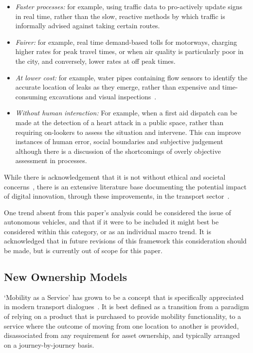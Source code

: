 \documentclass[journal]{IEEEtran}
\begin{document}
\begin{itemize}
\item {\emph{Faster processes:}} for example, using traffic data to
pro-actively update signs in real time, rather than the slow, reactive
methods by which traffic is informally advised against taking certain
routes.
\item {\emph{Fairer:}} for example, real time demand-based tolls for
motorways, charging higher rates for peak travel times, or when air
quality is particularly poor in the city, and conversely, lower rates
at off peak times.
\item {\emph{At lower cost:}} for example, water pipes containing flow
sensors to identify the accurate location of leaks as they emerge,
rather than expensive and time-consuming excavations and visual
inspections~\cite{cosgrave-et-al:2014}.
\item {\emph{Without human interaction:}} For example, when a first
aid dispatch can be made at the detection of a heart attack in a
public space, rather than requiring on-lookers to assess the situation
and intervene. This can improve instances of human error, social
boundaries and subjective judgement although there is a discussion of
the shortcomings of overly objective assessment in processes.
\end{itemize}

While there is acknowledgement that it is not without ethical and
societal concerns~\cite{bimber:1990,oatley-et-al_dasc:2015}, there is
an extensive literature base documenting the potential impact of
digital innovation, through these improvements, in the transport
sector~\cite{enoch:2015}.

One trend absent from this paper's analysis could be considered the
issue of autonomous vehicles, and that if it were to be included it
might best be considered within this category, or as an individual
macro trend. It is acknowledged that in future revisions of this
framework this consideration should be made, but is currently out of
scope for this paper.


\subsection{New Ownership Models}

`Mobility as a Service' has grown to be a concept that is specifically
appreciated in modern transport dialogues~\cite{tscatapult:2016}. It
is best defined as a transition from a paradigm of relying on a
product that is purchased to provide mobility functionality, to a
service where the outcome of moving from one location to another is
provided, disassociated from any requirement for asset ownership, and
typically arranged on a journey-by-journey basis.
\end{document}
